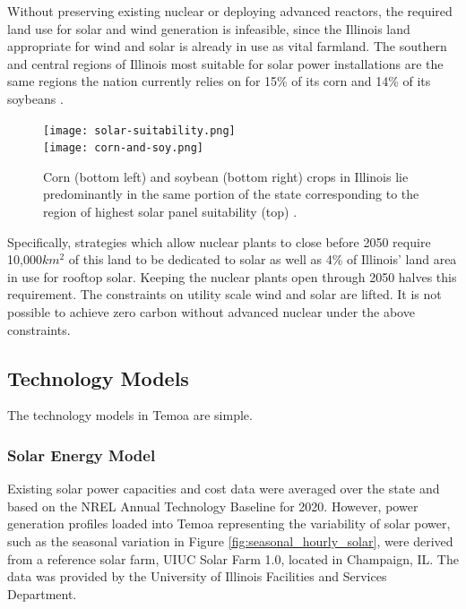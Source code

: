 Without preserving existing nuclear or deploying advanced reactors, the
required land use for solar and wind generation is infeasible, since the 
Illinois land appropriate for wind and solar is already in use as vital 
farmland. The southern and central regions of Illinois most suitable for solar 
power installations are the same regions the nation currently relies on for 
15\% of its corn and 14\% of its soybeans \cite{schleusener_illinois_2020}.  

\begin{figure}[htbp!]
        \begin{center}
                \texttt{[image: solar-suitability.png]}\\
                \vspace{0.5cm}
                \texttt{[image: corn-and-soy.png]}
        \end{center}
        \caption{Corn (bottom left) and soybean (bottom right) crops in Illinois lie predominantly in the 
        same portion of the state corresponding to the 
        region of highest solar panel suitability (top) 
        \cite{schleusener_illinois_2020,eispc_energy_2021,sengupta_national_2018}.}
        \label{fig:corn-and-soy}
\end{figure}


Specifically, strategies which allow nuclear plants to close before 2050 require 10,000$km^2$ of this land to be dedicated to solar as well as 4\% of Illinois' land area in use for rooftop solar. Keeping the nuclear plants open through 2050 halves this requirement.  
The constraints on utility scale wind and solar are lifted. It is not possible to achieve zero carbon without advanced nuclear under the above constraints.

\subsection{Technology Models}
The technology models in Temoa are simple. 
\subsubsection{Solar Energy Model}
Existing solar power capacities and cost data were averaged over the state and 
based on the \gls{NREL} Annual Technology Baseline for 2020. However, power 
generation profiles loaded into Temoa representing the variability of solar 
power, such as the seasonal variation in Figure 
\ref{fig:seasonal_hourly_solar}, were derived from a reference solar farm, UIUC Solar Farm 1.0, located in Champaign, IL. The data was provided by the University of Illinois Facilities and Services Department.
\FloatBarrier

